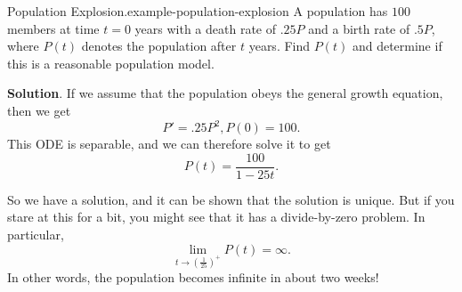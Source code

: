 \documentclass[10pt,]{book}
\numberwithin{equation}{section}
\begin{document}
\begin{example}{Population Explosion.}{example-population-explosion}%
\hypertarget{p-740}{}%
A population has \(100\) members at time \(t = 0\) years with a death rate of \(.25P\) and a birth rate of \(.5P\), where \(P(t)\) denotes the population after \(t\) years. Find \(P(t)\) and determine if this is a reasonable population model.%
\par\smallskip%
\noindent\textbf{Solution}.\hypertarget{solution-155}{}\quad%
\hypertarget{p-741}{}%
If we assume that the population obeys the general growth equation, then we get%
\begin{equation*}
P' = .25P^{2}, P(0) = 100.
\end{equation*}
This ODE is separable, and we can therefore solve it to get%
\begin{equation*}
P(t) = \frac{100}{1 - 25t}.
\end{equation*}
%
\par
\hypertarget{p-742}{}%
So we have a solution, and it can be shown that the solution is unique. But if you stare at this for a bit, you might see that it has a divide-by-zero problem. In particular,%
\begin{equation*}
\lim_{t\to(\frac{1}{25})^{+}}P(t) = \infty.
\end{equation*}
In other words, the population becomes infinite in about two weeks!%
\end{example}
%
%
\typeout{************************************************}
\typeout{************************************************}
%
\end{document}

